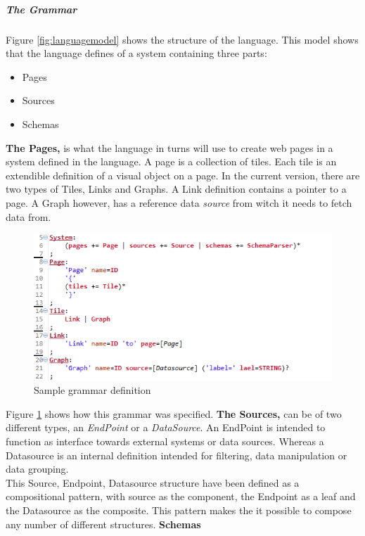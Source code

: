 \subparagraph{The Grammar}

Figure \ref{fig:languagemodel} shows the structure of the language.
This model shows that the language defines of a system containing three parts:
\begin{itemize}
\item Pages
\item Sources
\item Schemas
\end{itemize}
\textbf{The Pages,} is what the language in turns will use to create web pages in a system defined in the language.
A page is a collection of tiles. 
Each tile is an extendible definition of a visual object on a page.
In the current version, there are two types of Tiles, Links and Graphs.
A Link definition contains a pointer to a page. 
A Graph however, has a reference data \textit{source} from witch it needs to fetch data from.
\begin{figure}
\begin{center}
\includegraphics[width=\linewidth]{images/GrammaDefinition}
\end{center}
\caption{Sample grammar definition}
\label{fig:grammadefinition}
\end{figure}
Figure \ref{fig:grammadefinition} shows how this grammar was specified.
\textbf{The Sources, } can be of two different types, an \textit{EndPoint} or a \textit{DataSource}.
An EndPoint is intended to function as interface towards external systems or data sources. 
Whereas a Datasource is an internal definition intended for filtering, data manipulation or data grouping.\\
This Source, Endpoint, Datasource structure have been defined as a compositional pattern, with source as the component, the Endpoint as a leaf and the Datasource as the composite.
This pattern makes the it possible to compose any number of different structures.
\textbf{Schemas}
